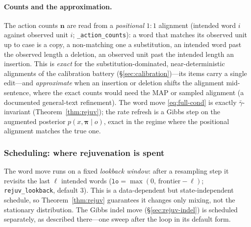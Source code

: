 \documentclass[11pt]{article}
\providecommand{\given}{\mid}
\providecommand{\code}[1]{\texttt{#1}}
\providecommand{\actdist}{\bm{\pi}}            %
\begin{document}
\paragraph{Counts and the approximation.} The action counts $\bm n$ are read from a \emph{positional} $1{:}1$ alignment (intended word $i$ against observed unit $i$; \code{\_action\_counts}): a word that matches its observed unit up to case is a copy, a non-matching one a substitution, an intended word past the observed length a deletion, an observed unit past the intended length an insertion. This is \emph{exact} for the substitution-dominated, near-deterministic alignments of the calibration battery (\S\ref{sec:calibration})---its items carry a single edit---and \emph{approximate} when an insertion or deletion shifts the alignment mid-sentence, where the exact counts would need the MAP or sampled alignment (a documented general-text refinement). The word move \eqref{eq:full-cond} is exactly $\bar\gamma$-invariant (Theorem~\ref{thm:rejuv}); the rate refresh is a Gibbs step on the augmented posterior $p(x,\actdist\given o)$, exact in the regime where the positional alignment matches the true one.

\subsubsection{Scheduling: where rejuvenation is spent}
\label{sec:gate}

The word move runs on a fixed \emph{lookback window}: after a resampling step it revisits the last $\ell$ intended words ($\code{lo} = \max(0,\,\text{frontier} - \ell)$; \code{rejuv\_lookback}, default $3$). This is a data-dependent but state-independent schedule, so Theorem~\ref{thm:rejuv} guarantees it changes only mixing, not the stationary distribution. The Gibbs indel move (\S\ref{sec:rejuv-indel}) is scheduled separately, as described there---one sweep after the loop in its default form.
\end{document}

